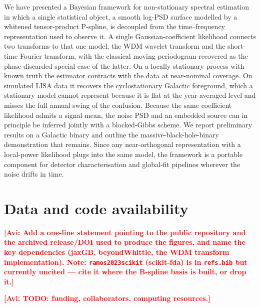 \documentclass[
  aps,
  prd,
  twocolumn,
  amsmath,
  amssymb,
  nofootinbib,
  superscriptaddress,
  longbibliography,
]{revtex4-2}
\newcommand{\project}[1]{\textsf{#1}}
\newcommand{\avi}[1]{\textcolor{red}{\textbf{[Avi: #1]}}}
\begin{document}
We have presented a Bayesian framework for non-stationary spectral estimation in
which a single statistical object, a smooth log-PSD surface modelled by a whitened
tensor-product P-spline, is decoupled from the time--frequency representation used
to observe it. A single Gaussian-coefficient likelihood connects two transforms to
that one model, the WDM wavelet transform and the short-time Fourier transform,
with the classical moving periodogram recovered as the phase-discarded special
case of the latter. On a locally stationary process with known truth the
estimator contracts with the data at near-nominal coverage. On
simulated LISA data it recovers the cyclostationary Galactic foreground, which a
stationary model cannot represent because it is flat at the year-averaged level
and misses the full annual swing of the confusion. Because the same coefficient
likelihood admits a signal mean, the noise PSD and an embedded source can in
principle be inferred jointly with a blocked-Gibbs scheme. We report preliminary
results on a Galactic binary and outline the massive-black-hole-binary
demonstration that remains.
Since any near-orthogonal representation with a local-power likelihood plugs into
the same model, the framework is a portable component for detector
characterisation and global-fit pipelines wherever the noise drifts in time.

\section*{Data and code availability}
\avi{Add a one-line statement pointing to the public repository and the archived
release/DOI used to produce the figures, and name the key dependencies
(\project{jaxGB}, \project{beyondWhittle}, the WDM transform implementation).
Note: \texttt{ramos2023scikit} (scikit-fda) is in \texttt{refs.bib} but currently
uncited --- cite it where the B-spline basis is built, or drop it.}

\begin{acknowledgments}
\avi{TODO: funding, collaborators, computing resources.}
\end{acknowledgments}



\end{document}
